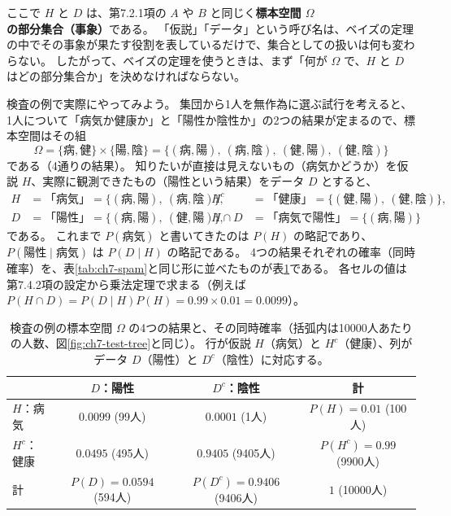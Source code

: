 ここで $H$ と $D$ は、第7.2.1項の $A$ や $B$ と同じく\textbf{標本空間 $\Omega$ の部分集合（事象）}である。
「仮説」「データ」という呼び名は、ベイズの定理の中でその事象が果たす役割を表しているだけで、集合としての扱いは何も変わらない。
したがって、ベイズの定理を使うときは、まず「何が $\Omega$ で、$H$ と $D$ はどの部分集合か」を決めなければならない。

検査の例で実際にやってみよう。
集団から1人を無作為に選ぶ試行を考えると、1人について「病気か健康か」と「陽性か陰性か」の2つの結果が定まるので、標本空間はその組
\begin{equation*}
  \Omega = \{\text{病}, \text{健}\} \times \{\text{陽}, \text{陰}\}
  = \{(\text{病}, \text{陽}),\ (\text{病}, \text{陰}),\ (\text{健}, \text{陽}),\ (\text{健}, \text{陰})\}
\end{equation*}
である（4通りの結果）。
知りたいが直接は見えないもの（病気かどうか）を仮説 $H$、実際に観測できたもの（陽性という結果）をデータ $D$ とすると、
\begin{align*}
  H &= \text{「病気」} = \{(\text{病}, \text{陽}),\ (\text{病}, \text{陰})\}, &
  H^c &= \text{「健康」} = \{(\text{健}, \text{陽}),\ (\text{健}, \text{陰})\}, \\
  D &= \text{「陽性」} = \{(\text{病}, \text{陽}),\ (\text{健}, \text{陽})\}, &
  H \cap D &= \text{「病気で陽性」} = \{(\text{病}, \text{陽})\}
\end{align*}
である。
これまで $P(\text{病気})$ と書いてきたのは $P(H)$ の略記であり、$P(\text{陽性} \mid \text{病気})$ は $P(D \mid H)$ の略記である。
4つの結果それぞれの確率（同時確率）を、表\ref{tab:ch7-spam}と同じ形に並べたものが表\ref{tab:ch7-test-joint}である。
各セルの値は第7.4.2項の設定から乗法定理で求まる（例えば $P(H \cap D) = P(D \mid H)P(H) = 0.99 \times 0.01 = 0.0099$）。

\begin{table}[tbp]
  \centering
  \caption{検査の例の標本空間 $\Omega$ の4つの結果と、その同時確率（括弧内は10000人あたりの人数、図\ref{fig:ch7-test-tree}と同じ）。
  行が仮説 $H$（病気）と $H^c$（健康）、列がデータ $D$（陽性）と $D^c$（陰性）に対応する。}
  \label{tab:ch7-test-joint}
  \begin{tabular}{l|cc|c}
    \hline
     & $D$：陽性 & $D^c$：陰性 & 計 \\
    \hline\hline
    $H$：病気 & $0.0099$ (99人) & $0.0001$ (1人) & $P(H) = 0.01$ (100人) \\
    $H^c$：健康 & $0.0495$ (495人) & $0.9405$ (9405人) & $P(H^c) = 0.99$ (9900人) \\
    \hline
    計 & $P(D) = 0.0594$ (594人) & $P(D^c) = 0.9406$ (9406人) & $1$ (10000人) \\
    \hline
  \end{tabular}
\end{table}

